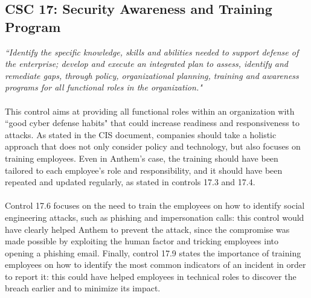 	\subsection{CSC 17: Security Awareness and Training Program}
	\textit{``Identify the specific knowledge, skills and abilities needed to support defense of the enterprise; develop and execute an integrated plan to assess, identify and remediate gaps, through policy, organizational planning, training and awareness programs for all functional roles in the organization."}\\\\
	This control aims at providing all functional roles within an organization with ``good cyber defense habits" that could increase readiness and responsiveness to attacks. As stated in the CIS document, companies should take a holistic approach that does not only consider policy and technology, but also focuses on training employees. Even in Anthem's case, the training should have been tailored to each employee's role and responsibility, and it should have been repeated and updated regularly, as stated in controls 17.3 and 17.4.\\\\
	Control 17.6 focuses on the need to train the employees on how to identify social engineering attacks, such as phishing and impersonation calls: this control would have clearly helped Anthem to prevent the attack, since the compromise was made possible by exploiting the human factor and tricking employees into opening a phishing email. Finally, control 17.9 states the importance of training employees on how to identify the most common indicators of an incident in order to report it: this could have helped employees in technical roles to discover the breach earlier and to minimize its impact.
	\newpage

